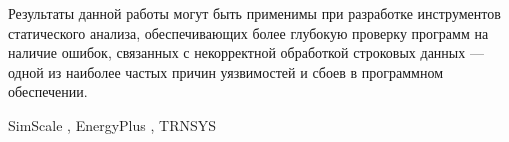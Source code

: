 Результаты данной работы могут быть применимы при разработке инструментов статического анализа, обеспечивающих более глубокую проверку программ на наличие ошибок, связанных с некорректной обработкой строковых данных — одной из наиболее частых причин уязвимостей и сбоев в программном обеспечении.

\newpage
{}



\newpage
{}
SimScale \cite{simscale}, EnergyPlus \cite{energyplus}, TRNSYS \cite{trnsys}

\newpage
